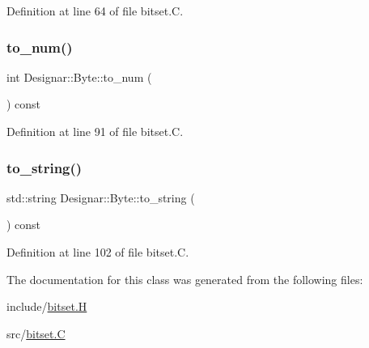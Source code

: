 Definition at line 64 of file bitset.\+C.

\mbox{\label{class_designar_1_1_byte_a1f10a6e5ad399f62c0d53ace68c7e43d}} 
\subsubsection{\texorpdfstring{to\+\_\+num()}{to\_num()}}
{\footnotesize\ttfamily int Designar\+::\+Byte\+::to\+\_\+num (\begin{DoxyParamCaption}{ }\end{DoxyParamCaption}) const}



Definition at line 91 of file bitset.\+C.

\mbox{\label{class_designar_1_1_byte_afddf5962874234208805ece07f31916d}} 
\subsubsection{\texorpdfstring{to\+\_\+string()}{to\_string()}}
{\footnotesize\ttfamily std\+::string Designar\+::\+Byte\+::to\+\_\+string (\begin{DoxyParamCaption}{ }\end{DoxyParamCaption}) const}



Definition at line 102 of file bitset.\+C.



The documentation for this class was generated from the following files\+:\begin{DoxyCompactItemize}
\item 
include/\hyperlink{bitset_8_h}{bitset.\+H}\item 
src/\hyperlink{bitset_8_c}{bitset.\+C}\end{DoxyCompactItemize}
